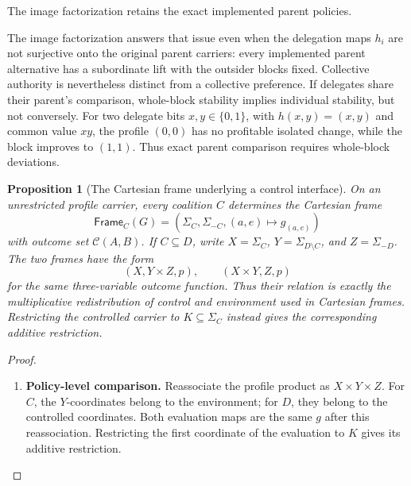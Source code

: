 \documentclass[11pt,a4paper]{article}
\numberwithin{equation}{section}
\newtheorem{proposition}[theorem]{Proposition}
\theoremstyle{definition}
\theoremstyle{remark}
\theoremstyle{plain}
\begin{document}
\noindent The image factorization retains the exact implemented parent policies.
\begin{center}
\end{center}

The image factorization answers that issue even when the delegation
maps $h_i$ are not surjective onto the original parent carriers: every
implemented parent alternative has a subordinate lift with the outsider
blocks fixed. Collective authority is nevertheless distinct from a
collective preference. If delegates share their parent's comparison,
whole-block stability implies individual stability, but not conversely.
For two delegate bits $x,y\in\{0,1\}$, with $h(x,y)=(x,y)$ and common
value $xy$, the profile $(0,0)$ has no profitable isolated change, while
the block improves to $(1,1)$. Thus exact parent comparison requires
whole-block deviations.

\begin{proposition}[The Cartesian frame underlying a control interface]
\label{prop:egt-cartesian-frame-comparison}
On an unrestricted profile carrier, every coalition $C$ determines the
Cartesian frame
\[
 \mathsf{Frame}_C(G)
 =\left(\Sigma_C,\Sigma_{-C},
       (a,e)\longmapsto g_{(a,e)}\right)
\]
with outcome set $\mathcal C(A,B)$. If $C\subseteq D$, write
$X=\Sigma_C$, $Y=\Sigma_{D\setminus C}$, and $Z=\Sigma_{-D}$.
The two frames have the form
\[
 (X,Y\times Z,p),\qquad (X\times Y,Z,p)
\]
for the same three-variable outcome function. Thus their relation is
exactly the multiplicative redistribution of control and environment
used in Cartesian frames. Restricting the controlled carrier to
$K\subseteq\Sigma_C$ instead gives the corresponding additive restriction.
\end{proposition}
\begin{proof}
\leavevmode
\begin{enumerate}[label=\textup{(\arabic*)},leftmargin=*,itemsep=4pt,topsep=3pt]
  \item \textbf{Policy-level comparison.} Reassociate the profile product as $X\times Y\times Z$. For $C$, the $Y$-coordinates belong to the environment; for $D$, they
belong to the controlled coordinates. Both evaluation maps are the
same $g$ after this reassociation. Restricting the first coordinate
of the evaluation to $K$ gives its additive restriction.
\end{enumerate}
\end{proof}
\end{document}

